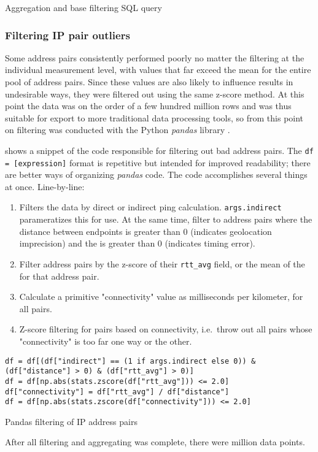 \begin{code}[h]
    \caption{Aggregation and base filtering SQL query}
    \label{code:agg_query}
\end{code}

\subsubsection{Filtering IP pair outliers}

Some \ip address pairs consistently performed poorly no matter the filtering at the individual measurement level, with \rtt values that far exceed the mean for the entire pool of address pairs. Since these values are also likely to influence results in undesirable ways, they were filtered out using the same z-score method. At this point the data was on the order of a few hundred million rows and was thus suitable for export to more traditional data processing tools, so from this point on filtering was conducted with the Python \textit{pandas} library \cite{pandas}.

 shows a snippet of the code responsible for filtering out bad \ip address pairs. The \texttt{df = [expression]} format is repetitive but intended for improved readability; there are better ways of organizing \textit{pandas} code. The code accomplishes several things at once. Line-by-line:

\begin{enumerate}
    \item Filters the data by direct or indirect ping calculation. \texttt{args.indirect} parameratizes this for \cli use. At the same time, filter to \ip address pairs where the distance between endpoints is greater than 0 (indicates geolocation imprecision) and the \rtt is greater than 0 (indicates timing error).
    \item Filter \ip address pairs by the z-score of their \texttt{rtt\_avg} field, or the mean of the \rtt for that address pair.
    \item Calculate a primitive "connectivity" value as milliseconds per kilometer, for all \ip pairs.
    \item Z-score filtering for \ip pairs based on connectivity, i.e.\ throw out all pairs whose "connectivity" is too far one way or the other.
\end{enumerate}

\begin{code}[h]
    \centering
    \begin{verbatim}
df = df[(df["indirect"] == (1 if args.indirect else 0)) & (df["distance"] > 0) & (df["rtt_avg"] > 0)]
df = df[np.abs(stats.zscore(df["rtt_avg"])) <= 2.0]
df["connectivity"] = df["rtt_avg"] / df["distance"]
df = df[np.abs(stats.zscore(df["connectivity"])) <= 2.0]
    \end{verbatim}
    \caption{Pandas filtering of IP address pairs}
    \label{code:pandas_filtering_ip_pair}
\end{code}

After all filtering and aggregating was complete, there were  million data points.

